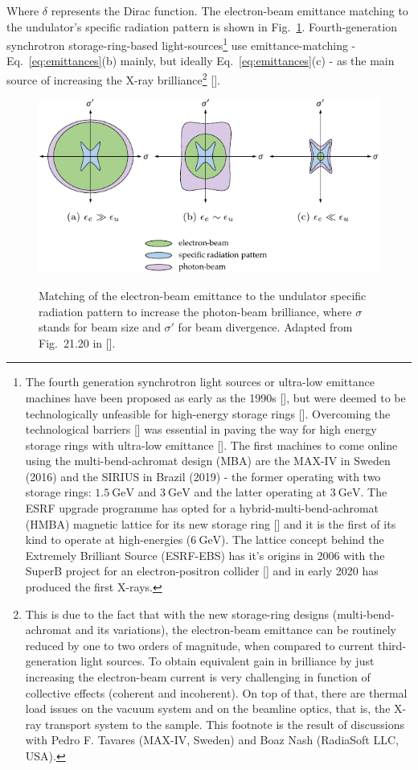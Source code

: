 \begin{refsection}
Where $\delta$ represents the Dirac function. The electron-beam emittance matching to the undulator's specific radiation pattern is shown in Fig.~\ref{fig:matching}. Fourth-generation synchrotron storage-ring-based light-sources\footnote{The fourth generation synchrotron light sources or ultra-low emittance machines have been proposed as early as the 1990s [\cite{Einfeld1996, Einfeld2014}], but were deemed to be technologically unfeasible for high-energy storage rings [\cite{Ropert2000, Elleaume2003}]. Overcoming the technological barriers [\cite{Borland2014}] was essential in paving the way for high energy storage rings with ultra-low emittance [\cite{Bei2010, Eriksson2016}]. The first machines to come online using the multi-bend-achromat design (MBA) are the MAX-IV in Sweden (2016) and the SIRIUS in Brazil (2019) - the former operating with two storage rings: $1.5~\mathrm{GeV}$ and $3~\mathrm{GeV}$ and the latter operating at $3~\mathrm{GeV}$. The ESRF upgrade programme has opted for a hybrid-multi-bend-achromat (HMBA) magnetic lattice for its new storage ring [\cite{Biasci2014}] and it is the first of its kind to operate at high-energies ($6~\mathrm{GeV}$). The lattice concept behind the Extremely Brilliant Source (ESRF-EBS) has it's origins in 2006 with the SuperB project for an electron-positron collider [\cite{Raimondi2017}] and in early 2020 has produced the first X-rays.} use emittance-matching - Eq.~\ref{eq:emittances}(b) mainly, but ideally Eq.~\ref{eq:emittances}(c) - as the main source of increasing the X-ray brilliance\footnote{This is due to the fact that with the new storage-ring designs (multi-bend-achromat and its variations), the electron-beam emittance can be routinely reduced by one to two orders of magnitude, when compared to current third-generation light sources. To obtain equivalent gain in brilliance by just increasing the electron-beam current is very challenging in function of collective effects (coherent and incoherent). On top of that, there are thermal load issues on the vacuum system and on the beamline optics, that is, the X-ray transport system to the sample. This footnote is the result of discussions with Pedro F. Tavares (MAX-IV, Sweden)  and Boaz Nash (RadiaSoft LLC, USA).} [\cite[\textit{§21.8.1}]{Wiedemann2015}].

\begin{figure}[t]
    \centering
    {\includegraphics[width=.6\linewidth]{figures/ch02/emittance.pdf}}
    \caption[Emittance matching]{Matching of the electron-beam emittance to the undulator specific radiation pattern to increase the photon-beam brilliance, where $\sigma$ stands for beam size and $\sigma'$ for beam divergence. Adapted from Fig.~21.20 in [\cite{Wiedemann2015}].}
    \label{fig:matching}
\end{figure}


\end{refsection}
